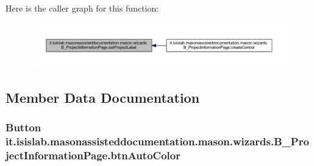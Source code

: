 Here is the caller graph for this function\-:
\nopagebreak
\begin{figure}[H]
\begin{center}
\leavevmode
\includegraphics[width=350pt]{classit_1_1isislab_1_1masonassisteddocumentation_1_1mason_1_1wizards_1_1_b___project_information_page_af5afa21c1d0087572ad8b3d0a1a1fe9c_icgraph}
\end{center}
\end{figure}




\subsection{Member Data Documentation}
\hypertarget{classit_1_1isislab_1_1masonassisteddocumentation_1_1mason_1_1wizards_1_1_b___project_information_page_a1c3cf5ff2d1b0d408f03db81e8e40c6a}{
\subsubsection[{btn\-Auto\-Color}]{\setlength{\rightskip}{0pt plus 5cm}Button it.\-isislab.\-masonassisteddocumentation.\-mason.\-wizards.\-B\-\_\-\-Project\-Information\-Page.\-btn\-Auto\-Color\hspace{0.3cm}{\ttfamily [private]}}}\label{classit_1_1isislab_1_1masonassisteddocumentation_1_1mason_1_1wizards_1_1_b___project_information_page_a1c3cf5ff2d1b0d408f03db81e8e40c6a}
